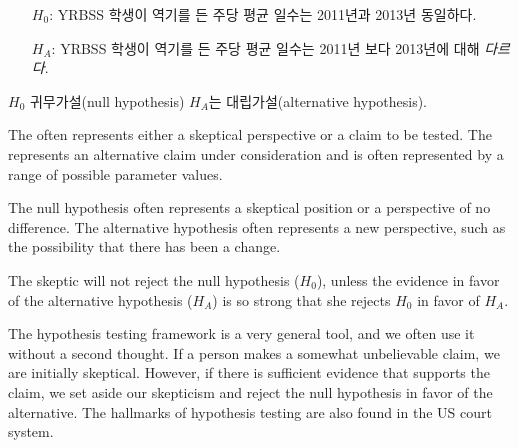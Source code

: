 \begin{itemize}
\setlength{\itemsep}{0mm}
\item[$H_0$:] YRBSS 학생이 역기를 든 주당 평균 일수는 2011년과 2013년 동일하다.
\item[$H_A$:] YRBSS 학생이 역기를 든 주당 평균 일수는 2011년 보다 2013년에 대해 \emph{다르다}.
\end{itemize}

$H_0$ 귀무가설(null hypothesis) $H_A$는 대립가설(alternative hypothesis).

\begin{termBox}{
{\small The  often represents either a skeptical perspective or a claim to be tested. The  represents an alternative claim under consideration and is often represented by a range of possible parameter values.}}
\end{termBox}

The null hypothesis often represents a skeptical position or a perspective of no difference. The alternative hypothesis often represents a new perspective, such as the possibility that there has been a change. 

\begin{tipBox}{
The skeptic will not reject the null hypothesis ($H_0$), unless the evidence in favor of the alternative hypothesis ($H_A$) is so strong that she rejects $H_0$ in favor of $H_A$.}
\end{tipBox}

The hypothesis testing framework is a very general tool, and we often use it without a second thought. If a person makes a somewhat unbelievable claim, we are initially skeptical. However, if there is sufficient evidence that supports the claim, we set aside our skepticism and reject the null hypothesis in favor of the alternative. The hallmarks of hypothesis testing are also found in the US court system. 

